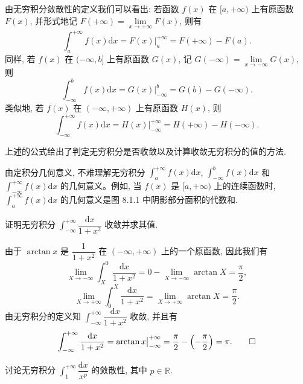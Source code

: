 由无穷积分敛散性的定义我们可以看出: 若函数 $f(x)$ 在 $[a,+\infty)$ 上有原函数 $F(x)$, 并形式地记 $F(+\infty)=\lim\limits_{x\to+\infty}F(x)$, 则有
\[
  \int_a^{+\infty}f(x)\mathrm dx=F(x)\big|_a^{+\infty}=F(+\infty)-F(a).
\]
同样, 若 $f(x)$ 在 $(-\infty,b]$ 上有原函数 $G(x)$, 记 $G(-\infty)=\lim\limits_{x\to-\infty}G(x)$, 则
\[
  \int_{-\infty}^b f(x)\mathrm dx=G(x)\big|_{-\infty}^b=G(b)-G(-\infty).
\]
类似地, 若 $f(x)$ 在 $(-\infty,+\infty)$ 上有原函数 $H(x)$, 则
\[
  \int_{-\infty}^{+\infty}f(x)\mathrm dx=H(x)\big|_{-\infty}^{+\infty}=H(+\infty)-H(-\infty).
\]

上述的公式给出了判定无穷积分是否收敛以及计算收敛无穷积分的值的方法.

由定积分几何意义, 不难理解无穷积分 $\int_a^{+\infty}f(x)\mathrm dx$, $\int_{-\infty}^b f(x)\mathrm dx$ 和 $\int_{-\infty}^{+\infty}f(x)\mathrm dx$ 的几何意义。例如, 当 $f(x)$ 是 $[a,+\infty)$ 上的连续函数时, $\int_a^{+\infty}f(x)\mathrm dx$ 的几何意义是图 8.1.1 中阴影部分面积的代数和.

\begin{example}\label{example:ma-8-1-1}
证明无穷积分 $\int_{-\infty}^{+\infty}\dfrac{\mathrm dx}{1+x^2}$ 收敛并求其值.
\end{example}


\begin{solve}
由于 $\arctan x$ 是 $\dfrac1{1+x^2}$ 在 $(-\infty,+\infty)$ 上的一个原函数, 因此我们有
\[
  \lim_{X\to-\infty}\int_X^0\frac{\mathrm dx}{1+x^2}
  =
  0-\lim_{X\to-\infty}\arctan X
  =
  \frac{\pi}{2},
\]
\[
  \lim_{X\to+\infty}\int_0^X\frac{\mathrm dx}{1+x^2}
  =
  \lim_{X\to+\infty}\arctan X
  =
  \frac{\pi}{2}.
\]
由无穷积分的定义知 $\int_{-\infty}^{+\infty}\dfrac{\mathrm dx}{1+x^2}$ 收敛, 并且有
\[
  \int_{-\infty}^{+\infty}\frac{\mathrm dx}{1+x^2}
  =
  \arctan x\big|_{-\infty}^{+\infty}
  =
  \frac{\pi}{2}-\left(-\frac{\pi}{2}\right)=\pi.
\qedhere
\]
\end{solve}


\begin{example}\label{example:ma-8-1-2}
讨论无穷积分 $\int_1^{+\infty}\dfrac{\mathrm dx}{x^p}$ 的敛散性, 其中 $p\in\mathbb R$.
\end{example}


